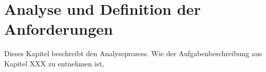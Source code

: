 \chapter{Analyse und Definition der Anforderungen } \label{kap:analyse_und_definition}

Dieses Kapitel beschreibt den Analyseprozess. Wie der Aufgabenbeschreibung aus Kapitel XXX zu entnehmen ist, 



